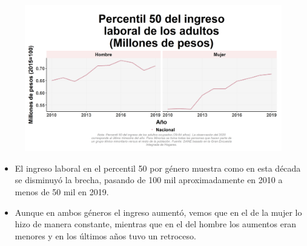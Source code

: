     \begin{figure}[H]
        \caption[Percentil 50 del ingreso laboral de los adultos por género ]{\label{inglab50adu_gen_trend} }
        \begin{center}
        \includegraphics[width=\textwidth,keepaspectratio]{img/var_19_trend.png}
        \end{center}
    \end{figure}
            \begin{itemize}
                \item El ingreso laboral en el percentil 50 por género muestra como en esta década se disminuyó la brecha, pasando de 100 mil aproximadamente en 2010 a menos de 50 mil en 2019.
                \item Aunque en ambos géneros el ingreso aumentó, vemos que en el de la mujer lo hizo de manera constante, mientras que en el del hombre los aumentos eran menores y en los últimos años tuvo un retroceso.
                \end{itemize}

